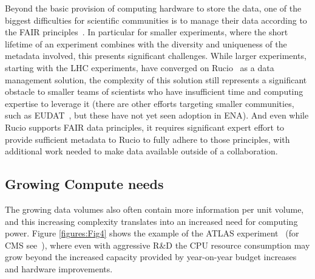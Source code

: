 Beyond the basic provision of computing hardware to store the data, one of the biggest difficulties for scientific communities is to manage their data according to the FAIR principles~\cite{Wilkinson2016}. In particular for smaller experiments, where the short lifetime of an experiment combines with the diversity and uniqueness of the metadata involved, this presents significant challenges.  While larger experiments, starting with the LHC experiments, have converged on Rucio~\cite{Barisits2019} as a data management solution, the complexity of this solution still represents a significant obstacle to smaller teams of scientists who have insufficient time and computing expertise to leverage it (there are other efforts targeting smaller communities, such as EUDAT~\cite{EUDAT}, but these have not yet seen adoption in ENA). And even while Rucio supports FAIR data principles, it requires significant expert effort to provide sufficient metadata to Rucio to fully adhere to those principles, with additional work needed to make data available outside of a collaboration.

\subsection{Growing Compute needs}

The growing data volumes also often contain more information per unit volume, and this increasing complexity translates into an increased need for computing power.  Figure \ref{figures:Fig4} shows the example of the ATLAS experiment~\cite{CERN-LHCC-2022-005} (for CMS see~\cite{Software:2815292}), where even with aggressive R\&D the CPU resource consumption may grow beyond the increased capacity provided by year-on-year budget increases and hardware improvements.


